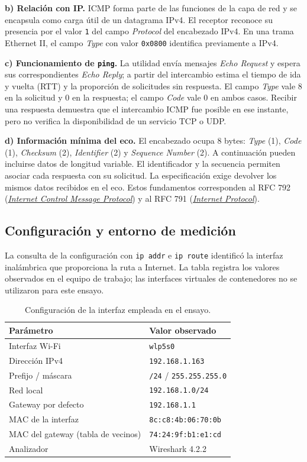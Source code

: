 \documentclass[12pt,a4paper]{article}
\begin{document}
\textbf{b) Relación con IP.} ICMP forma parte de las funciones de la capa de
red y se encapsula como carga útil de un datagrama IPv4. El receptor reconoce
su presencia por el valor \texttt{1} del campo \emph{Protocol} del encabezado
IPv4. En una trama Ethernet II, el campo \emph{Type} con valor
\texttt{0x0800} identifica previamente a IPv4.

\textbf{c) Funcionamiento de \texttt{ping}.} La utilidad envía mensajes
\emph{Echo Request} y espera sus correspondientes \emph{Echo Reply}; a partir
del intercambio estima el tiempo de ida y vuelta (RTT) y la proporción de
solicitudes sin respuesta. El campo \emph{Type} vale 8 en la solicitud y 0
en la respuesta; el campo \emph{Code} vale 0 en ambos casos. Recibir una
respuesta demuestra que el intercambio ICMP fue posible en ese instante,
pero no verifica la disponibilidad de un servicio TCP o UDP.

\textbf{d) Información mínima del eco.} El encabezado ocupa 8 bytes:
\emph{Type} (1), \emph{Code} (1), \emph{Checksum} (2), \emph{Identifier} (2)
y \emph{Sequence Number} (2). A continuación pueden incluirse datos de
longitud variable. El identificador y la secuencia permiten asociar cada
respuesta con su solicitud. La especificación exige devolver los mismos
datos recibidos en el eco. Estos fundamentos corresponden al RFC 792
(\href{https://www.rfc-editor.org/rfc/rfc792}{\emph{Internet Control Message
Protocol}}) y al RFC 791
(\href{https://www.rfc-editor.org/rfc/rfc791}{\emph{Internet Protocol}}).

\subsection{Configuración y entorno de medición}

La consulta de la configuración con \texttt{ip addr} e \texttt{ip route}
identificó la interfaz inalámbrica que proporciona la ruta a Internet.
La tabla registra los valores observados en el equipo de trabajo; las
interfaces virtuales de contenedores no se utilizaron para este ensayo.

\begin{table}[H]
\centering
\begin{tabular}{@{}ll@{}}
\toprule
\textbf{Parámetro} & \textbf{Valor observado} \\
\midrule
Interfaz Wi-Fi & \texttt{wlp5s0} \\
Dirección IPv4 & \texttt{192.168.1.163} \\
Prefijo / máscara & \texttt{/24} / \texttt{255.255.255.0} \\
Red local & \texttt{192.168.1.0/24} \\
Gateway por defecto & \texttt{192.168.1.1} \\
MAC de la interfaz & \texttt{8c:c8:4b:06:70:0b} \\
MAC del gateway (tabla de vecinos) & \texttt{74:24:9f:b1:e1:cd} \\
Analizador & Wireshark 4.2.2 \\
\bottomrule
\end{tabular}
\caption{Configuración de la interfaz empleada en el ensayo.}
\end{table}
\end{document}
